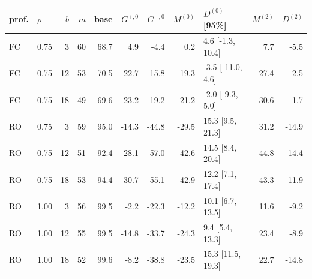 \begin{tabular}{llrr rrr rlrr}
\toprule
prof. & $\rho$ & $b$ & $m$ & base & $G^{+,0}$ & $G^{-,0}$ & $M^{(0)}$ & $D^{(0)}$ [95\%] & $M^{(2)}$ & $D^{(2)}$ \\
\midrule
FC & 0.75 & 3 & 60 & 68.7 & 4.9 & -4.4 & 0.2 & 4.6 [-1.3, 10.4] & 7.7 & -5.5 \\
FC & 0.75 & 12 & 53 & 70.5 & -22.7 & -15.8 & -19.3 & -3.5 [-11.0, 4.6] & 27.4 & 2.5 \\
FC & 0.75 & 18 & 49 & 69.6 & -23.2 & -19.2 & -21.2 & -2.0 [-9.3, 5.0] & 30.6 & 1.7 \\
RO & 0.75 & 3 & 59 & 95.0 & -14.3 & -44.8 & -29.5 & 15.3 [9.5, 21.3] & 31.2 & -14.9 \\
RO & 0.75 & 12 & 51 & 92.4 & -28.1 & -57.0 & -42.6 & 14.5 [8.4, 20.4] & 44.8 & -14.4 \\
RO & 0.75 & 18 & 53 & 94.4 & -30.7 & -55.1 & -42.9 & 12.2 [7.1, 17.4] & 43.3 & -11.9 \\
RO & 1.00 & 3 & 56 & 99.5 & -2.2 & -22.3 & -12.2 & 10.1 [6.7, 13.5] & 11.6 & -9.2 \\
RO & 1.00 & 12 & 55 & 99.5 & -14.8 & -33.7 & -24.3 & 9.4 [5.4, 13.3] & 23.4 & -8.9 \\
RO & 1.00 & 18 & 52 & 99.6 & -8.2 & -38.8 & -23.5 & 15.3 [11.5, 19.3] & 22.7 & -14.8 \\
\bottomrule
\end{tabular}